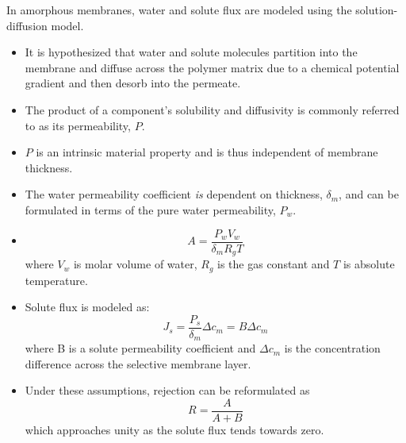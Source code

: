   In amorphous membranes, water and solute flux are modeled using the solution-diffusion 
  model.
  \begin{itemize}
    \item It is hypothesized that water and solute molecules partition into the
    membrane and diffuse across the polymer matrix due to a chemical potential
    gradient and then desorb into the permeate.
    \item The product of a component's solubility and diffusivity is commonly
    referred to as its permeability, $P$.~\cite{wijmans_solution-diffusion_1995}
    \item $P$ is an intrinsic material property and is thus independent of membrane
    thickness.  %
    \item The water permeability coefficient \textit{is} dependent on thickness, $\delta_m$,
    and can be formulated in terms of the pure water permeability, $P_w$.
    \item \begin{equation}
    A = \frac{P_wV_w}{\delta_mR_gT}
    \end{equation}
    where $V_w$ is molar volume of water, $R_g$ is the gas constant and $T$ is
    absolute temperature.
    \item Solute flux is modeled as:
    \begin{equation}
    J_s = \frac{P_s}{\delta_m}\Delta c_m = B\Delta c_m
    \end{equation}
    where B is a solute permeability coefficient and $\Delta c_m$ is the concentration
    difference across the selective membrane layer.
    \item Under these assumptions, rejection can be reformulated as
    \begin{equation}
    R = \frac{A}{A + B}
    \end{equation}
    which approaches unity as the solute flux tends towards zero.
  \end{itemize}  
  
